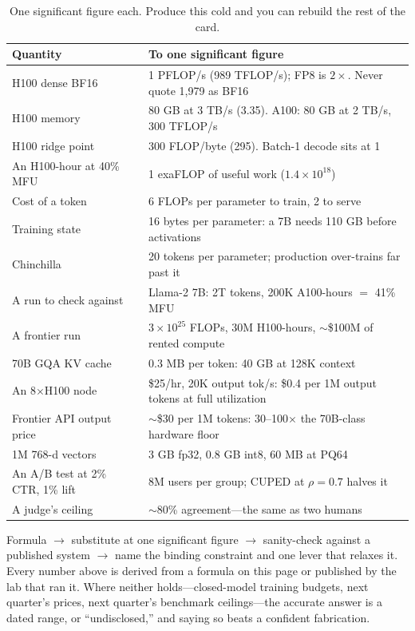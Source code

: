 \begin{table}[H]
\centering
\small
\caption{One significant figure each. Produce this cold and you can rebuild the rest of the card.}
\begin{tabularx}{\textwidth}{@{}lX@{}}
\toprule
\textbf{Quantity} & \textbf{To one significant figure} \\
\midrule
H100 dense BF16 & 1 PFLOP/s (989 TFLOP/s); FP8 is $2\times$. Never quote 1{,}979 as BF16 \\
H100 memory & 80 GB at 3 TB/s (3.35). A100: 80 GB at 2 TB/s, 300 TFLOP/s \\
H100 ridge point & 300 FLOP/byte (295). Batch-1 decode sits at 1 \\
An H100-hour at 40\% MFU & 1 exaFLOP of useful work ($1.4{\times}10^{18}$) \\
Cost of a token & 6 FLOPs per parameter to train, 2 to serve \\
Training state & 16 bytes per parameter: a 7B needs 110 GB before activations \\
Chinchilla & 20 tokens per parameter; production over-trains far past it \\
A run to check against & Llama-2 7B: 2T tokens, 200K A100-hours $=$ 41\% MFU \\
A frontier run & $3{\times}10^{25}$ FLOPs, 30M H100-hours, $\sim$\$100M of rented compute \\
70B GQA KV cache & 0.3 MB per token: 40 GB at 128K context \\
An 8$\times$H100 node & \$25/hr, 20K output tok/s: \$0.4 per 1M output tokens at full utilization \\
Frontier API output price & $\sim$\$30 per 1M tokens: 30--100$\times$ the 70B-class hardware floor \\
1M 768-d vectors & 3 GB fp32, 0.8 GB int8, 60 MB at PQ64 \\
An A/B test at 2\% CTR, 1\% lift & 8M users per group; CUPED at $\rho{=}0.7$ halves it \\
A judge's ceiling & $\sim$80\% agreement---the same as two humans \\
\bottomrule
\end{tabularx}
\end{table}

\begin{tldr}
Formula $\rightarrow$ substitute at one significant figure $\rightarrow$
sanity-check against a published system $\rightarrow$ name the binding
constraint and one lever that relaxes it. Every number above is derived from a
formula on this page or published by the lab that ran it. Where neither
holds---closed-model training budgets, next quarter's prices, next quarter's
benchmark ceilings---the accurate answer is a dated range, or ``undisclosed,''
and saying so beats a confident fabrication.
\end{tldr}
